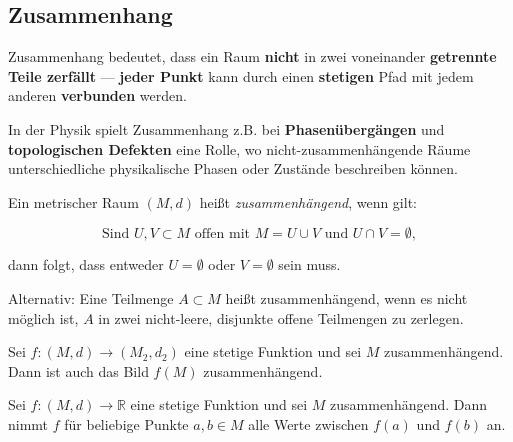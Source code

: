 \subsection{Zusammenhang}

Zusammenhang bedeutet, dass ein Raum \textbf{nicht} in zwei voneinander \textbf{getrennte Teile zerfällt} — \textbf{jeder Punkt} kann durch einen \textbf{stetigen }Pfad mit jedem anderen \textbf{verbunden} werden.

In der Physik spielt Zusammenhang z.B. bei \textbf{Phasenübergängen} und \textbf{topologischen Defekten} eine Rolle, wo nicht-zusammenhängende Räume unterschiedliche physikalische Phasen oder Zustände beschreiben können.


\begin{definition}{}
  Ein metrischer Raum $(M,d)$ heißt \emph{zusammenhängend}, wenn gilt:
  

$$
  \text{Sind } U,V \subset M \text{ offen mit } M = U \cup V \text{ und } U \cap V = \emptyset,
  $$


  dann folgt, dass entweder $U = \emptyset$ oder $V = \emptyset$ sein muss.
  
  Alternativ: Eine Teilmenge $A \subset M$ heißt zusammenhängend, wenn es nicht möglich ist, $A$ in zwei nicht-leere, disjunkte offene Teilmengen zu zerlegen.
\end{definition}

\begin{satz}{}
  Sei $f: (M,d) \to (M_2,d_2)$ eine stetige Funktion und sei $M$ zusammenhängend. Dann ist auch das Bild $f(M)$ zusammenhängend.
\end{satz}

\begin{korollar}
  Sei $f\colon (M,d) \to \mathbb{R}$ eine stetige Funktion und sei $M$ zusammenhängend. Dann nimmt $f$ für beliebige Punkte $a,b \in M$ alle Werte zwischen $f(a)$ und $f(b)$ an.
\end{korollar}
